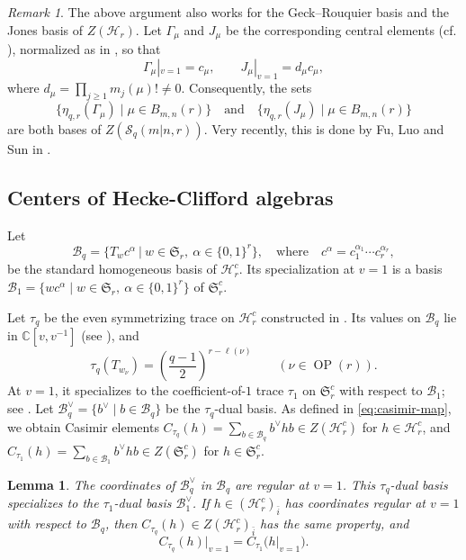 \documentclass[11pt]{amsart}
\numberwithin{equation}{section}
\theoremstyle{plain}
\newtheorem{lem}[thm]{Lemma}
\theoremstyle{definition}
\theoremstyle{remark}
\newtheorem{rmk}[thm]{Remark}
\begin{document}
\begin{rmk}\label{rmk:gl-other-bases}
The above argument also works for the Geck--Rouquier basis
and the Jones basis of $Z(\mathcal{H}_r)$. Let $\Gamma_\mu$ and $J_\mu$ be the
corresponding central elements (cf. \cite{GR97,Jo90}), normalized as in
\cite[\S2.2 and \S4.1]{WW15}, so that
$$
\Gamma_\mu|_{v=1}=c_\mu,
\qquad
J_\mu|_{v=1}=d_\mu c_\mu,$$
where
$d_\mu=\prod_{j\geq1}m_j(\mu)!\neq 0$.
Consequently, the sets
$$
\{\eta_{q,r}(\Gamma_\mu)\mid\mu\in B_{m,n}(r)\}
\quad\text{and}\quad
\{\eta_{q,r}(J_\mu)\mid\mu\in B_{m,n}(r)\}
$$
are both bases of $Z(\mathcal S_q(m|n,r))$. Very recently, this is done by Fu, Luo and Sun in \cite{FLS26}. 
\end{rmk}



\subsection{Centers of Hecke-Clifford algebras}
Let 
$$
\mathcal B_q
=
\{T_wc^\alpha~|~w\in\mathfrak S_r,\ \alpha\in\{0,1\}^r\},
\quad\text{where}\quad c^\alpha=c_1^{\alpha_1}\cdots c_r^{\alpha_r},
$$
be the standard homogeneous basis of $\mathcal H_r^c$.
Its specialization at $v=1$ is a basis
$\mathcal B_1=\{wc^\alpha\mid w\in\mathfrak S_r,\
\alpha\in\{0,1\}^r\}$ of $\mathfrak S_r^c$.

Let $\tau_q$ be the even symmetrizing trace on
$\mathcal H_r^c$ constructed in
\cite[\S5.2, Theorem~5.8]{WW13}.
Its values on $\mathcal B_q$ lie in $\mathbb C[v,v^{-1}]$
(see \cite[Theorem~4.7]{WW13}), and
$$
\tau_q(T_{w_\nu})
=\left(\frac{q-1}{2}\right)^{r-\ell(\nu)}
\qquad(\nu\in\operatorname{OP}(r)).
$$
At $v=1$, it specializes to the coefficient-of-$1$ trace
$\tau_1$ on $\mathfrak S_r^c$ with respect to $\mathcal B_1$;
see \cite[Remark~5.11]{WW13}.
Let $\mathcal B_q^\vee=\{b^\vee\mid b\in\mathcal B_q\}$
be the $\tau_q$-dual basis. As defined in \eqref{eq:casimir-map}, we obtain Casimir elements $C_{\tau_q}(h)=\sum_{b\in\mathcal B_q}b^\vee h b\in Z(\mathcal H_r^c)$ for $h\in\mathcal H_r^c$, and $C_{\tau_1}(h)=\sum_{b\in\mathcal B_1}b^\vee h b\in Z(\mathfrak S_r^c)$ for $h\in\mathfrak S_r^c$.

\begin{lem}\label{lem:q-casimir-special}
The coordinates of $\mathcal B_q^\vee$ in $\mathcal B_q$ are regular at $v=1$.
This $\tau_q$-dual basis specializes to the $\tau_1$-dual basis
$\mathcal B_1^\vee$.
If $h\in(\mathcal H_r^c)_{\bar i}$ has coordinates regular at $v=1$ with respect to $\mathcal B_q$, then
$C_{\tau_q}(h)\in Z(\mathcal H_r^c)_{\bar i}$
has the same property, and
$$
C_{\tau_q}(h)\big|_{v=1}
=
C_{\tau_1}\bigl(h\big|_{v=1}\bigr).
$$
\end{lem}
\end{document}
